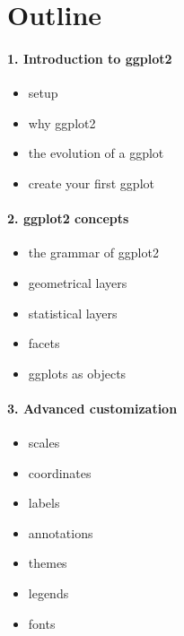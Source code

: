 \documentclass[
]{book}
\providecommand{\tightlist}{%
  \setlength{\itemsep}{0pt}\setlength{\parskip}{0pt}}
\begin{document}
\hypertarget{outline}{%
\section*{Outline}\label{outline}}

\hypertarget{introduction-to-ggplot2}{%
\paragraph*{1. Introduction to ggplot2}\label{introduction-to-ggplot2}}

\begin{itemize}
\tightlist
\item
  setup
\item
  why ggplot2
\item
  the evolution of a ggplot
\item
  create your first ggplot
\end{itemize}

\hypertarget{ggplot2-concepts}{%
\paragraph*{2. ggplot2 concepts}\label{ggplot2-concepts}}

\begin{itemize}
\tightlist
\item
  the grammar of ggplot2
\item
  geometrical layers
\item
  statistical layers
\item
  facets
\item
  ggplots as objects
\end{itemize}

\hypertarget{advanced-customization}{%
\paragraph*{3. Advanced customization}\label{advanced-customization}}

\begin{itemize}
\tightlist
\item
  scales
\item
  coordinates
\item
  labels
\item
  annotations
\item
  themes
\item
  legends
\item
  fonts
\end{itemize}
\end{document}

